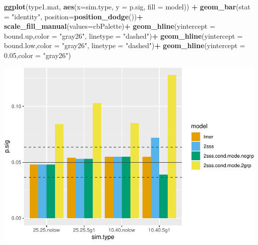 \documentclass[
]{book}
\newenvironment{Shaded}{\begin{snugshade}}{\end{snugshade}}
\newcommand{\CommentTok}[1]{\textcolor[rgb]{0.56,0.35,0.01}{\textit{#1}}}
\newcommand{\DataTypeTok}[1]{\textcolor[rgb]{0.13,0.29,0.53}{#1}}
\newcommand{\FloatTok}[1]{\textcolor[rgb]{0.00,0.00,0.81}{#1}}
\newcommand{\KeywordTok}[1]{\textcolor[rgb]{0.13,0.29,0.53}{\textbf{#1}}}
\newcommand{\NormalTok}[1]{#1}
\newcommand{\OperatorTok}[1]{\textcolor[rgb]{0.81,0.36,0.00}{\textbf{#1}}}
\newcommand{\StringTok}[1]{\textcolor[rgb]{0.31,0.60,0.02}{#1}}
\begin{document}
\begin{Shaded}
\begin{Highlighting}[]
\KeywordTok{ggplot}\NormalTok{(type1.mat, }\KeywordTok{aes}\NormalTok{(}\DataTypeTok{x=}\NormalTok{sim.type, }\DataTypeTok{y =}\NormalTok{ p.sig, }\DataTypeTok{fill =}\NormalTok{ model)) }\OperatorTok{+}\StringTok{ }\KeywordTok{geom\_bar}\NormalTok{(}\DataTypeTok{stat =} \StringTok{"identity"}\NormalTok{, }\DataTypeTok{position=}\KeywordTok{position\_dodge}\NormalTok{())}\OperatorTok{+}\StringTok{ }\KeywordTok{scale\_fill\_manual}\NormalTok{(}\DataTypeTok{values=}\NormalTok{cbPalette)}\OperatorTok{+}\StringTok{ }
\StringTok{  }\KeywordTok{geom\_hline}\NormalTok{(}\DataTypeTok{yintercept =}\NormalTok{ bound.up,}\DataTypeTok{color =} \StringTok{"gray26"}\NormalTok{, }\DataTypeTok{linetype =} \StringTok{"dashed"}\NormalTok{)}\OperatorTok{+}\StringTok{ }
\StringTok{  }\KeywordTok{geom\_hline}\NormalTok{(}\DataTypeTok{yintercept =}\NormalTok{ bound.low,}\DataTypeTok{color =} \StringTok{"gray26"}\NormalTok{, }\DataTypeTok{linetype =} \StringTok{"dashed"}\NormalTok{)}\OperatorTok{+}\StringTok{ }
\StringTok{  }\KeywordTok{geom\_hline}\NormalTok{(}\DataTypeTok{yintercept =} \FloatTok{0.05}\NormalTok{,}\DataTypeTok{color =} \StringTok{"gray26"}\NormalTok{)}
\end{Highlighting}
\end{Shaded}

\includegraphics{4_video6_group_comparison_three_models_files/figure-latex/unnamed-chunk-6-1.pdf}

\begin{Shaded}
\end{Shaded}
\end{document}
